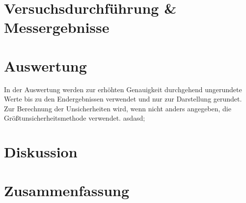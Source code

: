 \documentclass[12pt,a4paper,twoside]{article}
\begin{document}
\section{Versuchsdurchführung \& Messergebnisse}



\section{Auswertung}

In der Auswertung werden zur erhöhten Genauigkeit durchgehend ungerundete Werte bis zu den Endergebnissen verwendet und nur zur Darstellung gerundet. \\
Zur Berechnung der Unsicherheiten wird, wenn nicht anders angegeben, die Größtunsicherheitsmethode verwendet.
\cite{dirac}asdasd;


\section{Diskussion}



\section{Zusammenfassung}



\printbibliography[heading=bibintoc]
\end{document}
